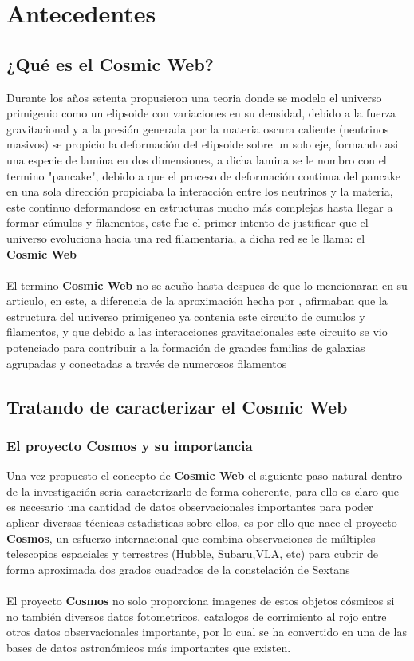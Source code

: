 \documentclass[11pt,letterpaper]{article}
\begin{document}
\section{Antecedentes}
\subsection{¿Qu\'e es el Cosmic Web?}
Durante los años setenta \cite{Pancakes} propusieron una teoria donde se modelo el universo primigenio como un elipsoide con variaciones en su densidad, debido a la fuerza gravitacional y a la presi\'on
generada por la  materia oscura caliente (neutrinos masivos) se propicio la deformaci\'on del elipsoide sobre un solo eje, formando asi una especie de lamina en dos dimensiones, a dicha lamina se le nombro con el termino "pancake", debido a que el proceso de deformaci\'on continua del pancake en una sola direcci\'on propiciaba
la interacci\'on entre los neutrinos y la materia, este continuo deformandose en estructuras mucho m\'as complejas hasta llegar a formar c\'umulos y filamentos, este fue el primer intento de justificar que el universo evoluciona hacia una red filamentaria, a dicha red se le llama: el \textbf{Cosmic Web}\,\\
\,\\
El termino \textbf{Cosmic Web} no se acuño hasta despues de que \cite{bond1996} lo mencionaran en su articulo, en este, a diferencia de la aproximaci\'on hecha por \cite{Pancakes}, afirmaban que la estructura del universo primigeneo ya contenia este circuito de cumulos y filamentos, y que debido a las interacciones gravitacionales este circuito se vio potenciado para contribuir a la formaci\'on de grandes familias de galaxias agrupadas y conectadas a trav\'es de numerosos filamentos 
\subsection{Tratando de caracterizar el Cosmic Web}
\subsubsection{El proyecto Cosmos y su importancia}
Una vez propuesto el concepto de \textbf{Cosmic Web} el siguiente paso natural dentro de la investigaci\'on seria caracterizarlo de forma coherente, para ello es claro
que es necesario una cantidad de datos observacionales importantes para poder aplicar diversas t\'ecnicas estadisticas sobre ellos, es por ello que nace el proyecto \textbf{Cosmos}, un esfuerzo internacional que combina observaciones de m\'ultiples telescopios espaciales y terrestres (Hubble, Subaru,VLA, etc) para cubrir de forma aproximada dos grados cuadrados de la constelaci\'on de Sextans
\,\\
\,\\
El proyecto \textbf{Cosmos} no solo proporciona imagenes de estos objetos c\'osmicos si no tambi\'en diversos datos fotometricos, catalogos de corrimiento al rojo entre otros datos observacionales importante, por lo cual se ha convertido en una de las bases de datos astron\'omicos m\'as importantes que existen.
\end{document}
